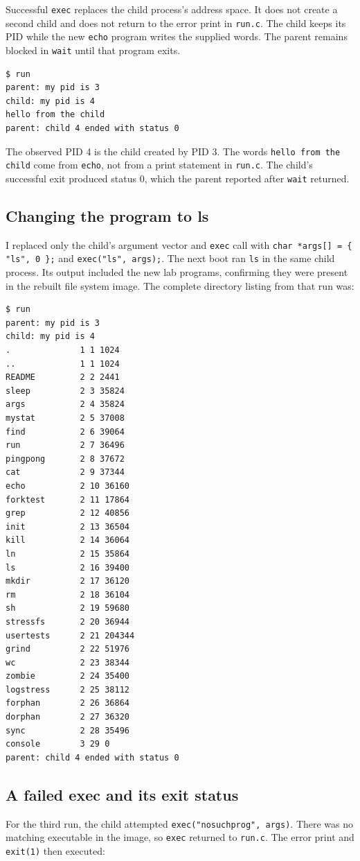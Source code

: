 \documentclass[12pt]{article}
\begin{document}
Successful \texttt{exec} replaces the child process's address space. It
does not create a second child and does not return to the error print in
\texttt{run.c}. The child keeps its PID while the new \texttt{echo}
program writes the supplied words. The parent remains blocked in
\texttt{wait} until that program exits.

\begin{lstlisting}
$ run
parent: my pid is 3
child: my pid is 4
hello from the child
parent: child 4 ended with status 0
\end{lstlisting}

The observed PID 4 is the child created by PID 3. The words
\texttt{hello from the child} come from \texttt{echo}, not from a print
statement in \texttt{run.c}. The child's successful exit produced status
0, which the parent reported after \texttt{wait} returned.

\clearpage
\subsection{Changing the program to ls}
I replaced only the child's argument vector and \texttt{exec} call with
\texttt{char *args[] = \{ "ls", 0 \};} and
\texttt{exec("ls", args);}. The next boot ran \texttt{ls} in the same
child process. Its output included the new lab programs, confirming they
were present in the rebuilt file system image. The complete directory
listing from that run was:

\begin{lstlisting}[basicstyle=\ttfamily\scriptsize]
$ run
parent: my pid is 3
child: my pid is 4
.              1 1 1024
..             1 1 1024
README         2 2 2441
sleep          2 3 35824
args           2 4 35824
mystat         2 5 37008
find           2 6 39064
run            2 7 36496
pingpong       2 8 37672
cat            2 9 37344
echo           2 10 36160
forktest       2 11 17864
grep           2 12 40856
init           2 13 36504
kill           2 14 36064
ln             2 15 35864
ls             2 16 39400
mkdir          2 17 36120
rm             2 18 36104
sh             2 19 59680
stressfs       2 20 36944
usertests      2 21 204344
grind          2 22 51976
wc             2 23 38344
zombie         2 24 35400
logstress      2 25 38112
forphan        2 26 36864
dorphan        2 27 36320
sync           2 28 35496
console        3 29 0
parent: child 4 ended with status 0
\end{lstlisting}

\subsection{A failed exec and its exit status}
For the third run, the child attempted
\texttt{exec("nosuchprog", args)}. There was no matching executable in
the image, so \texttt{exec} returned to \texttt{run.c}. The error print
and \texttt{exit(1)} then executed:
\end{document}
